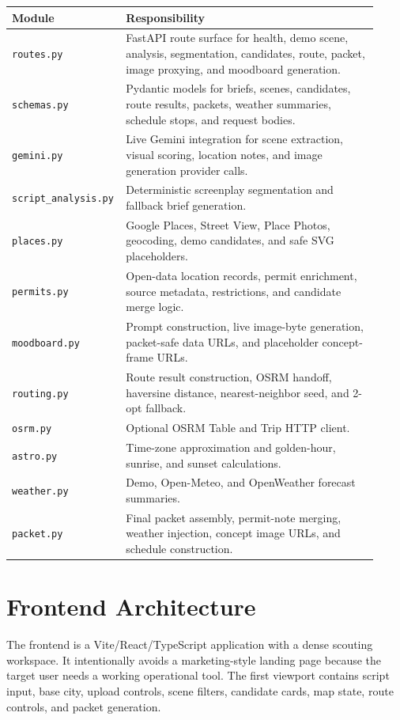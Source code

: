 \documentclass[11pt]{article}
\begin{document}
\begin{longtable}{>{\raggedright\arraybackslash}p{0.24\linewidth} >{\raggedright\arraybackslash}p{0.68\linewidth}}
\toprule
\textbf{Module} & \textbf{Responsibility} \\
\midrule
\endhead
\texttt{routes.py} & FastAPI route surface for health, demo scene, analysis, segmentation, candidates, route, packet, image proxying, and moodboard generation. \\
\texttt{schemas.py} & Pydantic models for briefs, scenes, candidates, route results, packets, weather summaries, schedule stops, and request bodies. \\
\texttt{gemini.py} & Live Gemini integration for scene extraction, visual scoring, location notes, and image generation provider calls. \\
\texttt{script\_analysis.py} & Deterministic screenplay segmentation and fallback brief generation. \\
\texttt{places.py} & Google Places, Street View, Place Photos, geocoding, demo candidates, and safe SVG placeholders. \\
\texttt{permits.py} & Open-data location records, permit enrichment, source metadata, restrictions, and candidate merge logic. \\
\texttt{moodboard.py} & Prompt construction, live image-byte generation, packet-safe data URLs, and placeholder concept-frame URLs. \\
\texttt{routing.py} & Route result construction, OSRM handoff, haversine distance, nearest-neighbor seed, and 2-opt fallback. \\
\texttt{osrm.py} & Optional OSRM Table and Trip HTTP client. \\
\texttt{astro.py} & Time-zone approximation and golden-hour, sunrise, and sunset calculations. \\
\texttt{weather.py} & Demo, Open-Meteo, and OpenWeather forecast summaries. \\
\texttt{packet.py} & Final packet assembly, permit-note merging, weather injection, concept image URLs, and schedule construction. \\
\bottomrule
\end{longtable}

\section{Frontend Architecture}

The frontend is a Vite/React/TypeScript application with a dense scouting
workspace. It intentionally avoids a marketing-style landing page because the
target user needs a working operational tool. The first viewport contains script
input, base city, upload controls, scene filters, candidate cards, map state,
route controls, and packet generation.
\end{document}
